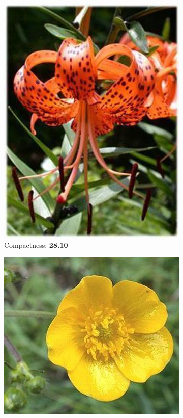 \documentclass[11]{article}
\begin{document}
 \begin{figure}[H]
    \begin{subfigure}[t]{.49\linewidth}
    \centering
  \includegraphics[scale=0.23]{images/compactness1.jpg}
  \caption{Compactness: \textbf{28.10}}
  \label{original}
    \end{subfigure}
    \begin{subfigure}[t]{.49\linewidth}
    \centering
    \includegraphics[scale=0.28]{images/compactness2.jpg}

\end{subfigure}
\end{figure}
\end{document}

